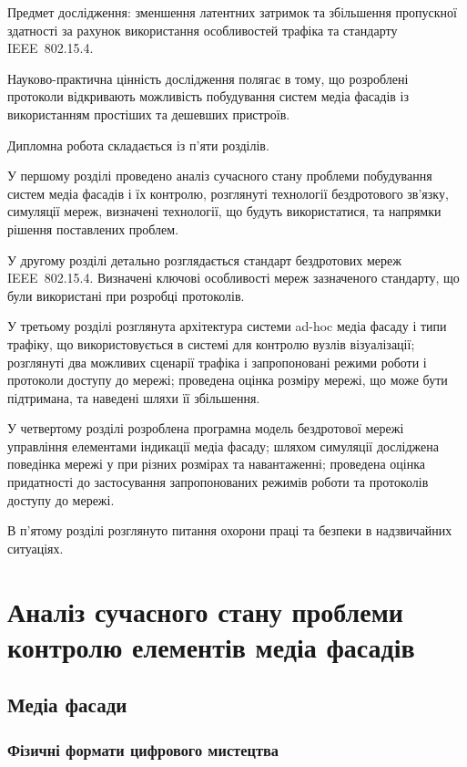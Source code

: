 \documentclass[a4paper,ukrainian,utf8,nocolumnsxix,floatsection,equationsection]{eskdtext}
\renewcommand\paragraph{\subsubsection}
\let\stdsection\section
\renewcommand\section{\clearpage\stdsection}
\newcommand{\iee}[0]{IEEE~802.15.4\xspace}
\begin{document}
Предмет дослідження: зменшення латентних затримок та збільшення пропускної здатності за рахунок використання особливостей трафіка та стандарту \iee.

Науково-практична цінність дослідження полягає в тому, що розроблені протоколи відкривають можливість побудування систем медіа фасадів із використанням простіших та дешевших пристроїв.

Дипломна робота складається із п’яти розділів.

У першому розділі проведено аналіз сучасного стану проблеми побудування систем медіа фасадів і їх контролю, розглянуті технології бездротового зв’язку, симуляції мереж, визначені технології, що будуть використатися, та напрямки рішення поставлених проблем.

У другому розділі детально розглядається стандарт бездротових мереж \iee. Визначені ключові особливості мереж зазначеного стандарту, що були використані при розробці протоколів.

У третьому розділі розглянута архітектура системи ad-hoc медіа фасаду і типи трафіку, що використовується в системі для контролю вузлів візуалізації; розглянуті два можливих сценарії трафіка і запропоновані режими роботи і протоколи доступу до мережі; проведена оцінка розміру мережі, що може бути підтримана, та наведені шляхи її збільшення.

У четвертому розділі розроблена програмна модель бездротової мережі управління елементами індикації медіа фасаду; шляхом симуляції досліджена поведінка мережі у при різних розмірах та навантаженні; проведена оцінка придатності до застосування запропонованих режимів роботи та протоколів доступу до мережі.

В п’ятому розділі розглянуто питання охорони праці та безпеки в надзвичайних ситуаціях.

\section{Аналіз сучасного стану проблеми контролю елементів медіа фасадів} %
\label{sec:1}

\subsection{Медіа фасади}


\paragraph{Фізичні формати цифрового мистецтва} %
\label{par:digital_art_physical_formats}
\end{document}
